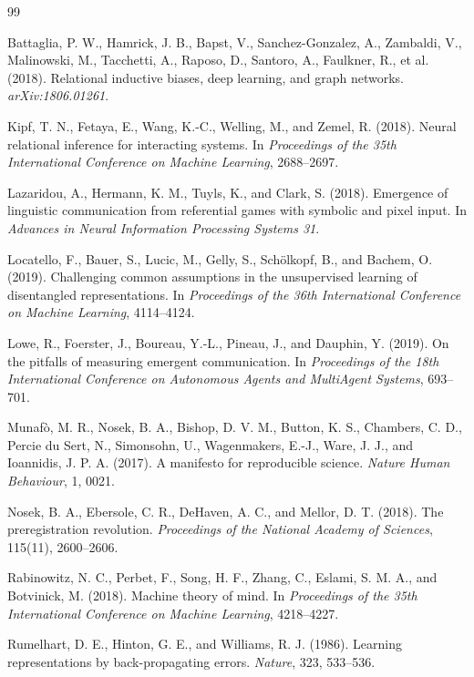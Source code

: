 \documentclass[11pt,a4paper]{article}
\begin{document}
\renewcommand{\refname}{Selected references}
\begin{thebibliography}{99}

Battaglia, P. W., Hamrick, J. B., Bapst, V., Sanchez-Gonzalez, A., Zambaldi, V., Malinowski, M., Tacchetti, A., Raposo, D., Santoro, A., Faulkner, R., et al. (2018). Relational inductive biases, deep learning, and graph networks. \emph{arXiv:1806.01261}.

Kipf, T. N., Fetaya, E., Wang, K.-C., Welling, M., and Zemel, R. (2018). Neural relational inference for interacting systems. In \emph{Proceedings of the 35th International Conference on Machine Learning}, 2688--2697.

Lazaridou, A., Hermann, K. M., Tuyls, K., and Clark, S. (2018). Emergence of linguistic communication from referential games with symbolic and pixel input. In \emph{Advances in Neural Information Processing Systems 31}.

Locatello, F., Bauer, S., Lucic, M., Gelly, S., Schölkopf, B., and Bachem, O. (2019). Challenging common assumptions in the unsupervised learning of disentangled representations. In \emph{Proceedings of the 36th International Conference on Machine Learning}, 4114--4124.

Lowe, R., Foerster, J., Boureau, Y.-L., Pineau, J., and Dauphin, Y. (2019). On the pitfalls of measuring emergent communication. In \emph{Proceedings of the 18th International Conference on Autonomous Agents and MultiAgent Systems}, 693--701.

Munafò, M. R., Nosek, B. A., Bishop, D. V. M., Button, K. S., Chambers, C. D., Percie du Sert, N., Simonsohn, U., Wagenmakers, E.-J., Ware, J. J., and Ioannidis, J. P. A. (2017). A manifesto for reproducible science. \emph{Nature Human Behaviour}, 1, 0021.

Nosek, B. A., Ebersole, C. R., DeHaven, A. C., and Mellor, D. T. (2018). The preregistration revolution. \emph{Proceedings of the National Academy of Sciences}, 115(11), 2600--2606.

Rabinowitz, N. C., Perbet, F., Song, H. F., Zhang, C., Eslami, S. M. A., and Botvinick, M. (2018). Machine theory of mind. In \emph{Proceedings of the 35th International Conference on Machine Learning}, 4218--4227.

Rumelhart, D. E., Hinton, G. E., and Williams, R. J. (1986). Learning representations by back-propagating errors. \emph{Nature}, 323, 533--536.


\end{thebibliography}
\end{document}
